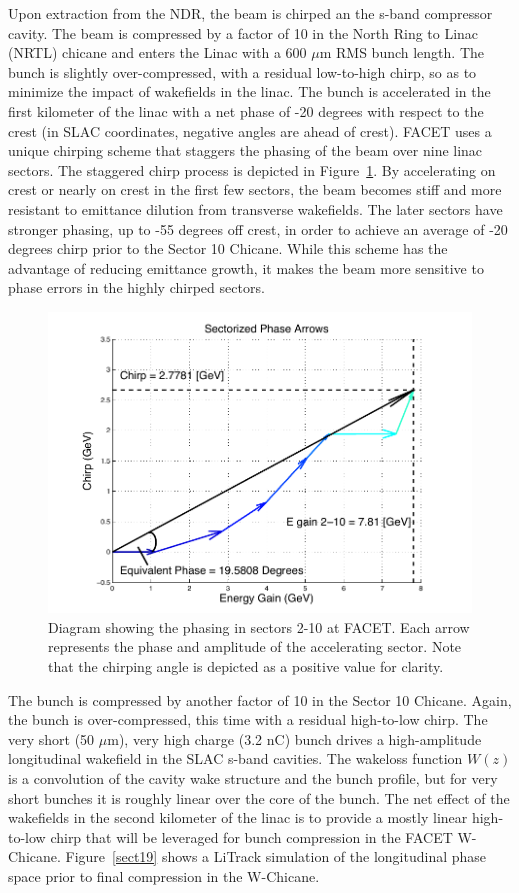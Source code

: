 Upon extraction from the NDR, the beam is chirped an the s-band compressor cavity. The beam is compressed by a factor of 10 in the North Ring to Linac (NRTL) chicane and enters the Linac with a 600 $\mu$m RMS bunch length. The bunch is slightly over-compressed, with a residual low-to-high chirp, so as to minimize the impact of wakefields in the linac. The bunch is accelerated in the first kilometer of the linac with a net phase of -20 degrees with respect to the crest (in SLAC coordinates, negative angles are ahead of crest). FACET uses a unique chirping scheme that staggers the phasing of the beam over nine linac sectors. The staggered chirp process is depicted in Figure~\ref{stag}. By accelerating on crest or nearly on crest in the first few sectors, the beam becomes stiff and more resistant to emittance dilution from transverse wakefields. The later sectors have stronger phasing, up to -55 degrees off crest, in order to achieve an average of -20 degrees chirp prior to the Sector 10 Chicane. While this scheme has the advantage of reducing emittance growth, it makes the beam more sensitive to phase errors in the highly chirped sectors.

\begin{figure}[hb]
  \includegraphics[width=\columnwidth]{figures/stag.pdf}
  \caption{Diagram showing the phasing in sectors 2-10 at FACET. Each arrow represents the phase and amplitude of the accelerating sector. Note that the chirping angle is depicted as a positive value for clarity.}
  \label{stag}
\end{figure}

The bunch is compressed by another factor of 10 in the Sector 10 Chicane. Again, the bunch is over-compressed, this time with a residual high-to-low chirp. The very short (50 $\mu$m), very high charge (3.2 nC) bunch drives a high-amplitude longitudinal wakefield in the SLAC s-band cavities. The wakeloss function $W(z)$ is a convolution of the cavity wake structure and the bunch profile, but for very short bunches it is roughly linear over the core of the bunch. The net effect of the wakefields in the second kilometer of the linac is to provide a mostly linear high-to-low chirp that will be leveraged for bunch compression in the FACET W-Chicane. Figure~\ref{sect19} shows a LiTrack simulation of the longitudinal phase space prior to final compression in the W-Chicane.

